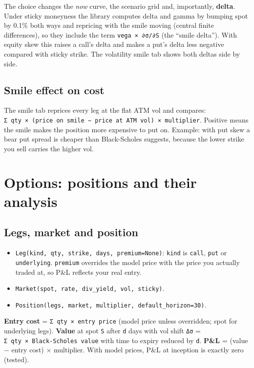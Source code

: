 \documentclass[10pt,a4paper]{article}
\providecommand{\tightlist}{\setlength{\itemsep}{1pt}\setlength{\parskip}{0pt}}
\numberwithin{equation}{section}
\begin{document}
The choice changes the \emph{now} curve, the scenario grid and, importantly, \textbf{delta}. Under sticky moneyness the library computes delta and gamma by bumping spot by 0.1\% both ways and repricing with the smile moving (central finite differences), so they include the term \texttt{vega\ ×\ ∂σ/∂S} (the ``smile delta''). With equity skew this raises a call's delta and makes a put's delta less negative compared with sticky strike. The volatility smile tab shows both deltas side by side.

\subsection{Smile effect on cost}\label{smile-effect-on-cost}

The smile tab reprices every leg at the flat ATM vol and compares: \texttt{Σ\ qty\ ×\ (price\ on\ smile\ −\ price\ at\ ATM\ vol)\ ×\ multiplier}. Positive means the smile makes the position more expensive to put on. Example: with put skew a bear put spread is cheaper than Black-Scholes suggests, because the lower strike you sell carries the higher vol.

\section{Options: positions and their analysis}\label{options-positions-and-their-analysis}

\subsection{Legs, market and position}\label{legs-market-and-position}

\begin{itemize}
\tightlist
\item
  \texttt{Leg(kind,\ qty,\ strike,\ days,\ premium=None)}: \texttt{kind} is \texttt{call}, \texttt{put} or \texttt{underlying}. \texttt{premium} overrides the model price with the price you actually traded at, so P\&L reflects your real entry.
\item
  \texttt{Market(spot,\ rate,\ div\_yield,\ vol,\ sticky)}.
\item
  \texttt{Position(legs,\ market,\ multiplier,\ default\_horizon=30)}.
\end{itemize}

\textbf{Entry cost} = \texttt{Σ\ qty\ ×\ entry\ price} (model price unless overridden; spot for underlying legs). \textbf{Value} at spot \texttt{S} after \texttt{d} days with vol shift \texttt{Δσ} = \texttt{Σ\ qty\ ×\ Black-Scholes\ value} with time to expiry reduced by \texttt{d}. \textbf{P\&L} = (value − entry cost) × multiplier. With model prices, P\&L at inception is exactly zero (tested).
\end{document}
